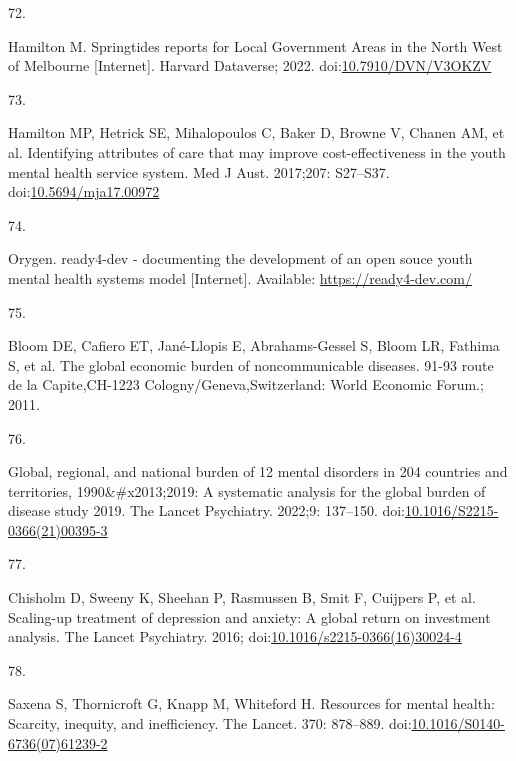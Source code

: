 \documentclass[
]{article}
\newlength{\cslhangindent}
\newlength{\csllabelwidth}
\newlength{\cslentryspacingunit} %
\newenvironment{CSLReferences}[2] %
 {%
  \setlength{\parindent}{0pt}
  \ifodd #1
  \let\oldpar\par
  \def\par{\hangindent=\cslhangindent\oldpar}
  \fi
  \setlength{\parskip}{#2\cslentryspacingunit}
 }%
 {}
\newcommand{\CSLLeftMargin}[1]{\parbox[t]{\csllabelwidth}{#1}}
\newcommand{\CSLRightInline}[1]{\parbox[t]{\linewidth - \csllabelwidth}{#1}\break}
\begin{document}
\begin{CSLReferences}{0}{0}
\leavevmode{}%
\CSLLeftMargin{72. }%
\CSLRightInline{Hamilton M. {Springtides reports for Local Government Areas in the North West of Melbourne} {[}Internet{]}. Harvard Dataverse; 2022. doi:\href{https://doi.org/10.7910/DVN/V3OKZV}{10.7910/DVN/V3OKZV}}

\leavevmode{}%
\CSLLeftMargin{73. }%
\CSLRightInline{Hamilton MP, Hetrick SE, Mihalopoulos C, Baker D, Browne V, Chanen AM, et al. Identifying attributes of care that may improve cost-effectiveness in the youth mental health service system. Med J Aust. 2017;207: S27--S37. doi:\href{https://doi.org/10.5694/mja17.00972}{10.5694/mja17.00972}}

\leavevmode{}%
\CSLLeftMargin{74. }%
\CSLRightInline{Orygen. ready4-dev - documenting the development of an open souce youth mental health systems model {[}Internet{]}. Available: \url{https://ready4-dev.com/}}

\leavevmode{}%
\CSLLeftMargin{75. }%
\CSLRightInline{Bloom DE, Cafiero ET, Jané-Llopis E, Abrahams-Gessel S, Bloom LR, Fathima S, et al. The global economic burden of noncommunicable diseases. 91-93 route de la Capite,CH-1223 Cologny/Geneva,Switzerland: World Economic Forum.; 2011. }

\leavevmode{}%
\CSLLeftMargin{76. }%
\CSLRightInline{Global, regional, and national burden of 12 mental disorders in 204 countries and territories, 1990\&\#x2013;2019: A systematic analysis for the global burden of disease study 2019. The Lancet Psychiatry. 2022;9: 137--150. doi:\href{https://doi.org/10.1016/S2215-0366(21)00395-3}{10.1016/S2215-0366(21)00395-3}}

\leavevmode{}%
\CSLLeftMargin{77. }%
\CSLRightInline{Chisholm D, Sweeny K, Sheehan P, Rasmussen B, Smit F, Cuijpers P, et al. Scaling-up treatment of depression and anxiety: A global return on investment analysis. The Lancet Psychiatry. 2016; doi:\href{https://doi.org/10.1016/s2215-0366(16)30024-4}{10.1016/s2215-0366(16)30024-4}}

\leavevmode{}%
\CSLLeftMargin{78. }%
\CSLRightInline{Saxena S, Thornicroft G, Knapp M, Whiteford H. Resources for mental health: Scarcity, inequity, and inefficiency. The Lancet. 370: 878--889. doi:\href{https://doi.org/10.1016/S0140-6736(07)61239-2}{10.1016/S0140-6736(07)61239-2}}


\end{CSLReferences}
\end{document}
